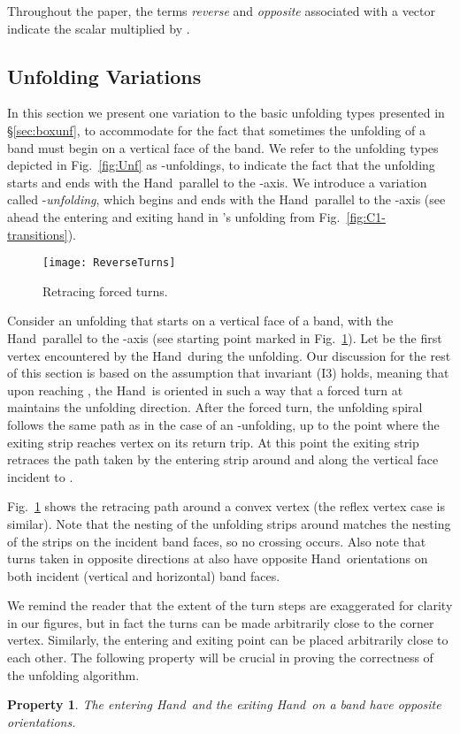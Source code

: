 \documentclass[11pt]{article}
\newtheorem{property}[theorem]{Property}
\newcommand\hand{{\sc Hand}}
\begin{document}
Throughout the paper, the terms \emph{reverse} and \emph{opposite} associated with a vector  indicate the scalar  multiplied by . 

\subsection{Unfolding Variations}
\label{sec:kinunf}
In this section we present one variation to the basic unfolding types presented in \S\ref{sec:boxunf}, to accommodate for the fact that sometimes the unfolding of a band must begin on a vertical face of the band. We refer to the unfolding types depicted in Fig.~\ref{fig:Unf} as -unfoldings, to indicate the fact that the unfolding starts and ends with the \hand\ parallel to the -axis. We introduce a variation called -\emph{unfolding}, which begins and ends with the \hand\ parallel to the -axis (see ahead the entering and exiting hand in 's unfolding from Fig.~\ref{fig:C1-transitions}). 
\begin{figure}[htbp]
\centering
\texttt{[image: ReverseTurns]}
\caption{Retracing forced turns.}
\label{fig:reverseturns}
\end{figure}


Consider an unfolding that starts on a vertical face of a band, with the \hand\ parallel to the -axis (see starting point marked  in Fig.~\ref{fig:reverseturns}). 
Let  be the first vertex encountered by the \hand\ during the unfolding. Our discussion for the rest of this section is based on the assumption that invariant (I3) holds, meaning that upon reaching , the \hand\ is oriented in such a way that a forced turn at  maintains the unfolding direction. After the forced turn, the unfolding spiral follows the same path as in the case of an -unfolding, up to the point where the exiting strip reaches vertex  on its return trip. At this point the exiting strip retraces the path taken by the entering strip around  and along the vertical face incident to .

Fig.~\ref{fig:reverseturns} shows the retracing path around a convex vertex  (the reflex vertex case is similar). 
Note that the nesting of the unfolding strips around  matches the nesting of the strips on the incident band faces, so no crossing occurs. Also note that turns taken in opposite directions at  also have opposite \hand\ orientations on both incident (vertical and horizontal) band faces.

We remind the reader that the extent of the turn steps are exaggerated for clarity in our figures, but in fact the turns can be made arbitrarily close to the corner vertex. Similarly, the entering and exiting point can be placed arbitrarily close to each other. The following property will be crucial in proving the correctness of the unfolding algorithm.
\begin{property}
The entering \hand\ and the exiting \hand\ on a band have opposite orientations. 
\label{prop:handexit}
\end{property}
\end{document}
